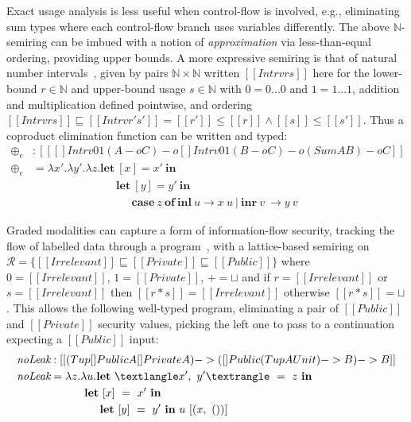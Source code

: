 \begin{example}%
\label{exm:or3}
Exact usage analysis is less useful when control-flow is involved, e.g.,
eliminating sum types where each control-flow branch uses variables differently.
The above $\mathbb{N}$-semiring can be imbued with a notion of
\emph{approximation} via less-than-equal ordering, providing upper bounds. A
more expressive semiring is that of natural number
intervals~\cite{DBLP:journals/pacmpl/OrchardLE19}, given by pairs $\mathbb{N}
\times \mathbb{N}$ written $[[ Intrv r s ]]$ here for the lower-bound $r \in
\mathbb{N}$ and upper-bound usage $s \in \mathbb{N}$ with $0 = 0 ... 0$
and $1 = 1 ... 1$, addition and multiplication defined pointwise, and
ordering $[[ Intrv r s ]] \sqsubseteq [[ Intrv r' s' ]] = [[ r' ]] \leq [[ r ]]
\wedge [[ s ]] \leq [[ s' ]]$. Thus a coproduct elimination function can be
written and typed:
%
\begin{align*}
\oplus_e & : [[ {[] {Intrv 0 1} (A -o C)} -o {{[] {Intrv 0 1} (B -o C)} -o {(Sum A B) -o C}} ]] \\
\oplus_e & =
\lambda x' . \lambda y' . \lambda z. \textbf{let}\ [x] = x'\ \textbf {in}\ \\ 
          & \;\;\;\;\;\;\;\;\;\;\;\;\;\;\;\;\;\;\;\;\;\;\;\;\;\;\; \textbf{let}\ [y] = y'\ \textbf{in}\ \\ 
          & \;\;\;\;\;\;\;\;\;\;\;\;\;\;\;\;\;\;\;\;\;\;\;\;\;\;\;\;\;\;\;\; \textbf{case}\ z\ \textbf{of}\
\textbf{inl}\ u \rightarrow x\ u\ |\ \textbf{inr}\ v\ \rightarrow y\ v
\end{align*}
\end{example}

\begin{example}%
\label{exm:security}
%
Graded modalities can capture a form of information-flow security, tracking the
flow of labelled data through a program~\cite{DBLP:journals/pacmpl/OrchardLE19},
with a lattice-based semiring on $\mathcal{R} = \{[[ Irrelevant ]] \sqsubseteq
[[ Private ]] \sqsubseteq  [[ Public ]]\}$ where $0 = [[ Irrelevant ]]$, $1 = [[
Private ]]$, $+ = \sqcup$ and if $r = [[ Irrelevant ]]$ or $s = [[ Irrelevant
]]$ then $[[r * s ]] = [[ Irrelevant ]]$ otherwise $[[ r * s ]] = \sqcup$. This
allows the following well-typed program, eliminating a pair of $[[ Public ]]$
and $[[ Private ]]$ security values, picking the left one to pass to a
continuation expecting a $[[ Public ]]$ input:
%
\begin{align*}
\textit{noLeak} & : [[ (Tup {[] Public A} {[] Private A}) -> {({[]
                  Public (Tup A Unit)} -> B) -> B} ]] \\
\textit{noLeak} & = \lambda z . \lambda u . \textbf{let}\ \textlangle x',\ y' \textrangle\ =\ z\ \textbf{in}\ \\
                & \;\;\;\;\;\;\;\;\;\;\; \textbf{let}\ [x]\ =\ x'\ \textbf{in}\ \\ 
                & \;\;\;\;\;\;\;\;\;\;\;\;\;\;\;\; \textbf{let}\ [y]\ =\ y'\ \textbf{in}\ u\ [(x,\ ())]
\end{align*}
\end{example}


